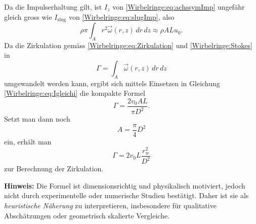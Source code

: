 Da die Impulserhaltung gilt, ist \(I_z\) von \eqref{Wirbelringe:eq:achssymImp} ungefähr gleich gross wie \(I_{\text{slug}}\) von \eqref{Wirbelringe:eq:slugImp}, also
\begin{equation}
    \rho\pi\int_{A}r^2\vec{\omega}(r,z)\,dr\,dz
    \approx
    \rho ALu_0
    \label{Wirbelringe:eq:Igleichi}.
\end{equation}
Da die Zirkulation gemäss \eqref{Wirbelringe:eq:Zirkulation} und \ref{Wirbelringe:Stokes} in
\begin{equation*}
    \Gamma
    =
    \int_{A}\vec{\omega}(r,z)\,dr\,dz
\end{equation*}
umgewandelt werden kann, ergibt sich mittels Einsetzen in Gleichung \eqref{Wirbelringe:eq:Igleichi} die kompakte Formel
\begin{equation*}
    \Gamma
    =
    \frac{2v_0AL}{\pi D^2}.
\end{equation*}
Setzt man dann noch
\begin{equation*}
    A
    =
    \frac{\pi}{4} D^2
\end{equation*}
ein, erhält man
\begin{equation}
    \label{Wirbelringe:eq:naeherungZirkulation}
    \Gamma
    =
    2v_0L\frac{r_w^2}{D^2}
\end{equation}
zur Berechnung der Zirkulation.

\textbf{Hinweis:}
Die Formel ist dimensionsrichtig und physikalisch motiviert, jedoch nicht durch experimentelle oder numerische Studien bestätigt.
Daher ist sie als \emph{heuristische Näherung} zu interpretieren, insbesondere für qualitative Abschätzungen oder geometrisch skalierte Vergleiche.